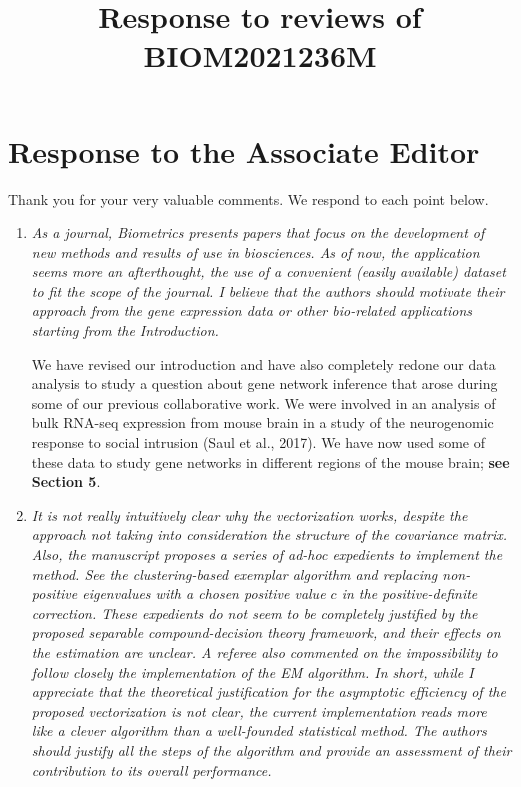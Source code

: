 \documentclass[12pt]{article}
\title{Response to reviews of BIOM2021236M}
\author{}
\date{}
\begin{document}
\maketitle

\section{Response to the Associate Editor}

Thank you for your very valuable comments. We respond to each point below.

\begin{enumerate}
\item \emph{As a journal, Biometrics presents papers that focus on the development of new methods and results of use in biosciences. As of now, the application seems more an afterthought, the use of a convenient (easily available) dataset to fit the scope of the journal. I believe that the authors should motivate their approach from the gene expression data or other bio-related applications starting from the Introduction.}

  We have revised our introduction and have also completely redone our data analysis to study a question about gene network inference that arose during some of our previous collaborative work. We were involved in an analysis of bulk RNA-seq expression from mouse brain in a study of the neurogenomic response to social intrusion (Saul et al., 2017). We have now used some of these data to study gene networks in different regions of the mouse brain; \textbf{see Section 5}.

  
\item \emph{It is not really intuitively clear why the vectorization works, despite the approach not taking into consideration the structure of the covariance matrix. Also, the manuscript proposes a series of ad-hoc expedients to implement the method. See the clustering-based exemplar algorithm and replacing non-positive eigenvalues with a chosen positive value $c$ in the positive-definite correction. These expedients do not seem to be completely justified by the proposed separable compound-decision theory framework, and their effects on the estimation are unclear. A referee also commented on the impossibility to follow closely the implementation of the EM algorithm. In short, while I appreciate that the theoretical justification for the asymptotic efficiency of the proposed vectorization is not clear, the current implementation reads more like a clever algorithm than a well-founded statistical method. The authors should justify all the steps of the algorithm and provide an assessment of their contribution to its overall performance.}


\end{enumerate}
\end{document}
